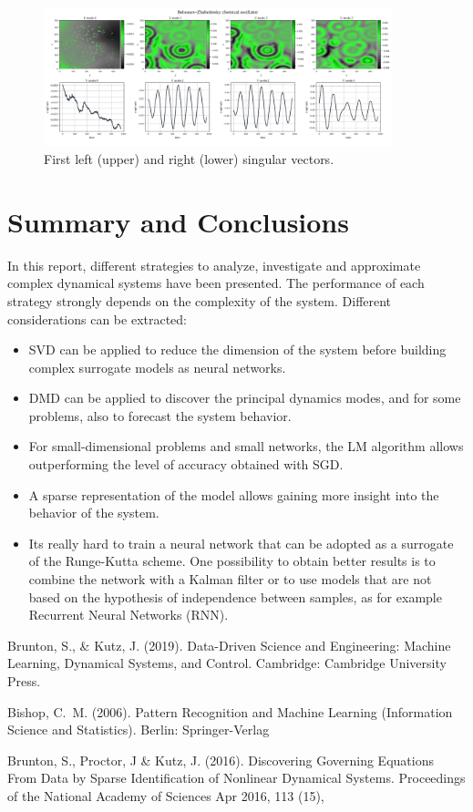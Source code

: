 \documentclass[]{article}
\begin{document}
\begin{figure}[h]
	\centering
	\includegraphics[width=0.9\textwidth]{../figures/BZ_firstmodes.png}
	\caption{First left (upper) and right (lower) singular vectors.}
	\label{fig:fig16}
\end{figure}

\section{Summary and Conclusions}
In this report, different strategies to analyze, investigate and approximate complex dynamical systems have been presented. The performance of each strategy strongly depends on the complexity of the system. Different considerations can be extracted:
\begin{itemize}
	\item SVD can be applied to reduce the dimension of the system before building complex surrogate models as neural networks.
	\item DMD can be applied to discover the principal dynamics modes, and for some problems, also to forecast the system behavior.
	\item For small-dimensional problems and small networks, the LM  algorithm allows outperforming the level of accuracy obtained with SGD.
	\item A sparse representation of the model allows gaining more insight into the behavior of the system.
	\item Its really hard to train a neural network that can be adopted as a surrogate of the Runge-Kutta scheme. One possibility to obtain better results is to combine the network with a Kalman filter or to use models that are not based on the hypothesis of independence between samples, as for example Recurrent Neural Networks (RNN).
\end{itemize}

\begin{thebibliography}{99} %
	Brunton, S., \& Kutz, J. (2019). Data-Driven Science and Engineering: Machine Learning, Dynamical Systems, and Control. Cambridge: Cambridge University Press.
	
	Bishop, C.~M. (2006). Pattern Recognition and Machine Learning (Information Science and Statistics). Berlin: Springer-Verlag
	
	Brunton, S.,  Proctor, J \& Kutz, J. (2016). Discovering Governing Equations From Data by Sparse Identification of Nonlinear Dynamical Systems.
	Proceedings of the National Academy of Sciences Apr 2016, 113 (15),
\end{thebibliography}
\end{document}
